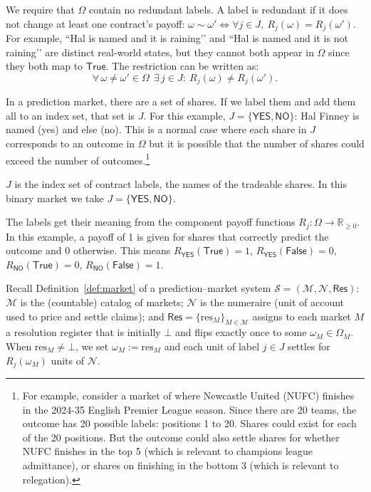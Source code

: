 
We require that $\Omega$ contain no redundant labels. A label is redundant if it does not change at least one contract’s payoff: $\omega\sim\omega' \iff \forall j\in J,\ R_j(\omega)=R_j(\omega')$. For example, “Hal is named and it is raining’’ and “Hal is named and it is not raining’’ are distinct real-world states, but they cannot both appear in $\Omega$ since they both map to $\mathsf{True}$. The restriction can be written as:
\[
\forall\,\omega\neq\omega'\in\Omega\ \ \exists\,j\in J:\ R_j(\omega)\neq R_j(\omega').
\]

In a prediction market, there are a set of shares. If we label them and add them all to an index set, that set is $J$. For this example, $J=\{\textsf{YES},\textsf{NO}\}$: Hal Finney is named (yes) and else (no). This is a normal case where each share in $J$ corresponds to an outcome in $\Omega$ but it is possible that the number of shares could exceed the number of outcomes.\footnote{For example, consider a market of where Newcastle United (NUFC) finishes in the 2024-35 English Premier League season. Since there are 20 teams, the outcome has 20 possible labels: positions 1 to 20. Shares could exist for each of the 20 positions. But the outcome could also settle shares for whether NUFC finishes in the top 5 (which is relevant to champions league admittance), or shares on finishing in the bottom 3 (which is relevant to relegation).}

$J$ is the index set of contract labels, the names of the tradeable shares. In this binary market we take $J=\{\textsf{YES},\textsf{NO}\}$. 

The labels get their meaning from the component payoff functions $R_j:\Omega\to\mathbb{R}_{\ge 0}$. In this example, a payoff of 1 is given for shares that correctly predict the outcome and 0 otherwise. This means $R_{\textsf{YES}}(\mathsf{True})=1$, $R_{\textsf{YES}}(\mathsf{False})=0$, $R_{\textsf{NO}}(\mathsf{True})=0$, $R_{\textsf{NO}}(\mathsf{False})=1$.

Recall Definition~\ref{def:market} of a prediction--market system $\mathcal{S}=(\mathcal{M},\mathcal{N},\mathsf{Res})$:
$\mathcal{M}$ is the (countable) catalog of markets; $\mathcal{N}$ is the numeraire (unit of account used to price and settle claims);
and $\mathsf{Res}=\{\mathrm{res}_M\}_{M\in\mathcal{M}}$ assigns to each market $M$ a resolution register that is initially
$\bot$ and flips exactly once to some $\omega_M\in\Omega_M$.
When $\mathrm{res}_M\neq\bot$, we set $\omega_M:=\mathrm{res}_M$ and each unit of label $j\in J$ settles for $R_j(\omega_M)$ units of $\mathcal{N}$.

